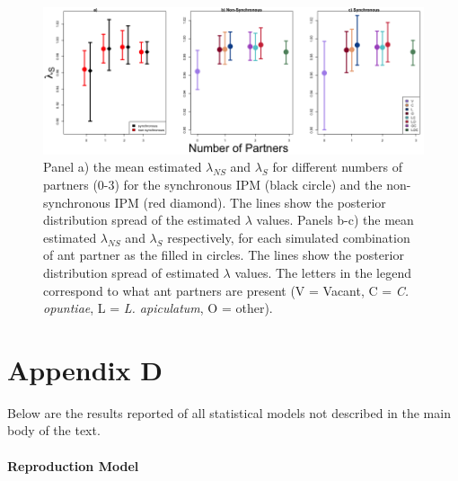 \documentclass[11pt]{article}
\begin{document}
\begin{figure}
\includegraphics[width=0.91\linewidth]{Figures/Lambdas_equal_lines.png}
	\caption{Panel a) the mean estimated $\lambda_{NS}$ and $\lambda_{S}$ for different numbers of partners (0-3) for the synchronous IPM (black circle) and the non-synchronous IPM (red diamond). The lines show the posterior distribution spread of the estimated $\lambda$ values. Panels b-c) the mean estimated $\lambda_{NS}$ and $\lambda_{S}$ respectively, for each simulated combination of ant partner as the filled in circles. The lines show the posterior distribution spread of estimated $\lambda$ values. The letters in the legend correspond to what ant partners are present (V = Vacant, C = \textit{C. opuntiae}, L = \textit{L. apiculatum}, O = other).}
\label{app:EqualLambdaMeans}
\end{figure}


\section*{Appendix D}\label{appendix:D}
Below are the results reported of all statistical models not described in the main body of the text. 

\paragraph{Reproduction Model}

\renewcommand{\thefigure}{A\arabic{figure}}
\end{document}

